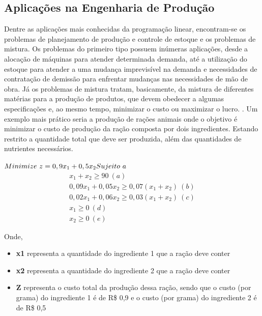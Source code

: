 \subsection{Aplicações na Engenharia de Produção}
Dentre as aplicações mais conhecidas da programação linear, encontram-se os problemas de planejamento de produção e controle de estoque e os problemas de mistura. Os problemas do primeiro tipo possuem inúmeras aplicações, desde a alocação de máquinas para atender determinada demanda, até a utilização do estoque para atender a uma mudança imprevisível na demanda e necessidades de contratação de demissão para enfrentar mudanças nas necessidades de mão de obra. Já os problemas de mistura tratam, basicamente, da mistura de diferentes matérias para a produção de produtos, que devem obedecer a algumas especificações e, ao mesmo tempo, minimizar o custo ou maximizar o lucro.  \cite{Taha}.
Um exemplo mais prático seria a produção de rações animais onde o objetivo é minimizar o custo de produção da ração composta por dois ingredientes. Estando restrito a quantidade total que deve ser produzida, além das quantidades de nutrientes necessários.

 $\\Minimize\ z=0,9x_{1}+0,5x_{2}\\
Sujeito\ a\\$
\begin{eqnarray*}
        x_{1}+x_{2}\geq 90 \ (a)\\
        0,09x_{1}+0,05x_{2}\geq 0,07(x_{1}+x_{2}) \ (b)\\
        0,02x_{1}+0,06x_{2}\geq 0,03(x_{1}+x_{2}) \ (c)\\
         x_{1}\geq 0 \ (d)\\
	 x_{2}\geq 0 \ (e)
\end{eqnarray*}

Onde, 
\begin{itemize}
\item \textbf {x1} representa a quantidade do ingrediente 1 que a ração deve conter
\item \textbf {x2} representa a quantidade do ingrediente 2 que a ração deve conter
\item \textbf {Z} representa o custo total da produção dessa ração, sendo que o custo (por grama) do ingrediente 1 é de R\$ 0,9 e o custo (por grama) do ingrediente 2 é de R\$ 0,5
\end{itemize}

